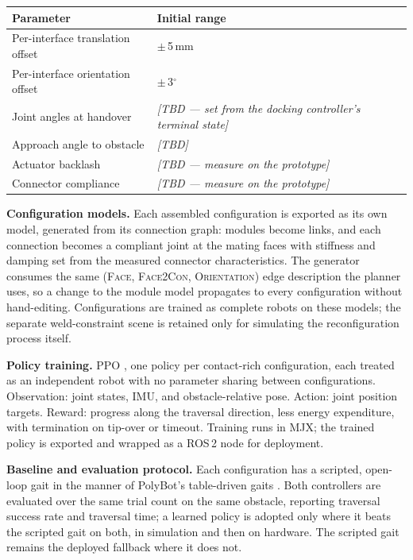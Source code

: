 \documentclass[11pt,a4paper]{article}
\newif\ifnotes
\newcommand{\note}[1]{\ifnotes{\color{Red}\small\textsf{[#1]}}\fi}
\newif\ifreview
\newcommand{\pending}[1]{\ifreview{\color{blue}#1}\else#1\fi}
\newenvironment{pblock}{\ifreview\color{blue}\fi}{}
\begin{document}
\begin{pblock}
\begin{longtable}{@{}L{0.40\textwidth} L{0.52\textwidth}@{}}
\toprule
\textbf{Parameter} & \textbf{Initial range} \\
\midrule
\endhead
Per-interface translation offset & $\pm$\,5\,mm \\
Per-interface orientation offset & $\pm$\,3$^\circ$ \\
Joint angles at handover &
  \textit{[TBD --- set from the docking controller's terminal state]} \\
Approach angle to obstacle & \textit{[TBD]} \\
Actuator backlash & \textit{[TBD --- measure on the prototype]} \\
Connector compliance & \textit{[TBD --- measure on the prototype]} \\
\bottomrule
\end{longtable}
\end{pblock}

\pending{%
\noindent\textbf{Configuration models.} Each assembled configuration is
exported as its own model, generated from its connection graph: modules become
links, and each connection becomes a compliant joint at the mating faces with
stiffness and damping set from the measured connector characteristics. The
generator consumes the same (\textsc{Face}, \textsc{Face2Con},
\textsc{Orientation}) edge description the planner uses, so a change to the
module model propagates to every configuration without hand-editing.
Configurations are trained as complete robots on these models; the separate
weld-constraint scene is retained only for simulating the reconfiguration
process itself.

\noindent\textbf{Policy training.} PPO \cite{schulman2017}, one policy per
contact-rich configuration, each treated as an independent robot with no
parameter sharing between configurations. Observation: joint states, IMU, and
obstacle-relative pose. Action: joint position targets. Reward: progress along
the traversal direction, less energy expenditure, with termination on tip-over
or timeout.\note{reward weights and episode length TBD} Training runs in MJX;
the trained policy is exported and wrapped as a ROS\,2 node for deployment.

\noindent\textbf{Baseline and evaluation protocol.} Each configuration has a
scripted, open-loop gait in the manner of PolyBot's table-driven gaits
\cite{yim2003}. Both controllers are evaluated over the same trial count on the
same obstacle, reporting traversal success rate and traversal time; a learned
policy is adopted only where it beats the scripted gait on both, in simulation
and then on hardware. The scripted gait remains the deployed fallback where it
does not.
}
\end{document}
